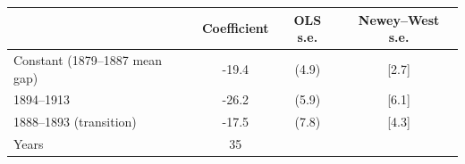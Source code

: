 \begin{tabular}{lccc}
\toprule
 & Coefficient & OLS s.e. & Newey--West s.e. \\
\midrule
Constant (1879--1887 mean gap) & -19.4 & (4.9) & [2.7] \\
1894--1913 & -26.2 & (5.9) & [6.1] \\
1888--1893 (transition) & -17.5 & (7.8) & [4.3] \\
Years & 35 &  &  \\
\bottomrule
\end{tabular}
